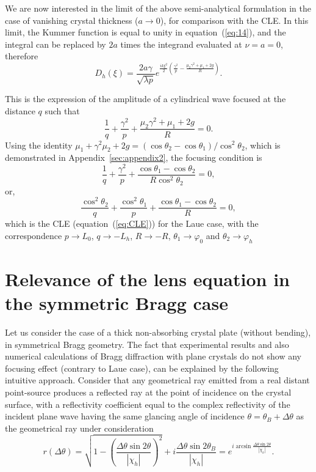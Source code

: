 \documentclass[preprint]{iucr}              %
\newcommand{\inred}[1]{{\color{red}#1}}
\begin{document}
We are now interested in the limit of the above semi-analytical formulation in the case of vanishing crystal thickness ($a\rightarrow0{}$), for comparison with the CLE. In this limit, the Kummer function is equal to unity in equation~(\ref{eq:14}), and the integral can be replaced by $2a$ times the integrand evaluated at $\nu=a=0$, therefore
\begin{equation}
\label{eq:14reduced}
    D_h(\xi) = \frac{2 a \gamma}{\sqrt{\lambda p}} e^{\frac{i k \xi^2}{2}(\frac{\gamma^2}{p}-\frac{\mu_2\gamma^2+\mu_1+2g}{R})}.
\end{equation}

This is the expression of the amplitude of a cylindrical wave focused at the distance $q$ such that
\begin{equation}
    \frac{1}{q}+\frac{\gamma^2}{p}+\frac{\mu_2\gamma^2+\mu_1+2g}{R}=0. 
\end{equation}
Using the identity $\mu_1+\gamma^2\mu_2+2g=(\cos\theta_2-\cos\theta_1)/\cos^2\theta_2$, which is demonstrated in Appendix~\ref{sec:appendix2}, the focusing condition is 
\begin{equation}
    \frac{1}{q}+\frac{\gamma^2}{p}+\frac{\cos\theta_1-\cos\theta_2}{R\cos^2\theta_2}=0,
\end{equation}
or,
\begin{equation}
    \frac{\cos^2\theta_2}{q}+\frac{\cos^2\theta_1}{p}+\frac{\cos\theta_1-\cos\theta_2}{R}=0,
\end{equation}
which is the CLE (equation~(\ref{eq:CLE})) for the Laue case, with the correspondence $p \rightarrow L_0$, $q \rightarrow -L_h$, $R \rightarrow -R$, $\theta_1 \rightarrow \varphi_0$ and $\theta_2 \rightarrow \varphi_h$


\section{Relevance of the lens equation in the symmetric Bragg case}
\label{sec:BraggGeometry}
Let us consider the case of a thick non-absorbing {\plane} crystal plate (without bending), in symmetrical Bragg geometry. The fact that experimental results and also numerical calculations \cite{aripekka}  of Bragg diffraction with plane crystals do not show any focusing effect \inred{(contrary to Laue case)}, can be explained by the following intuitive approach. Consider that any geometrical ray emitted from a real distant point-source produces a reflected ray at the point of incidence on the crystal surface, with a reflectivity coefficient equal to the complex reflectivity of the incident plane wave having the same glancing angle of incidence $\theta=\theta_B+\Delta\theta$ as the geometrical ray under consideration
\begin{equation}
\label{eq:braggDiffProfile}
    r(\Delta\theta) = \sqrt{1-\left(\frac{\Delta\theta\sin2\theta}{|\chi_h|}\right)^2} + i \frac{\Delta\theta\sin2\theta_B}{|\chi_h|} =
    e^{i \arcsin{\frac{\Delta\theta \sin2\theta}{ |\chi_h|}}}.
\end{equation}
\end{document}
